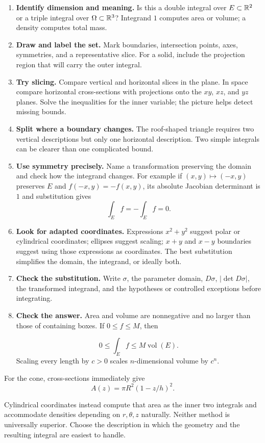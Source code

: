 \begin{enumerate}[label=\arabic*.]
\item \textbf{Identify dimension and meaning.} Is this a double integral
over $E\subset\mathbb{R}^2$ or a triple integral over $\Omega\subset\mathbb{R}^3$?
Integrand $1$ computes area or volume; a density computes total mass.
\item \textbf{Draw and label the set.} Mark boundaries, intersection
points, axes, symmetries, and a representative slice. For a solid, include
the projection region that will carry the outer integral.
\item \textbf{Try slicing.} Compare vertical and horizontal slices in
the plane. In space compare horizontal cross-sections with projections
onto the $xy$, $xz$, and $yz$ planes. Solve the inequalities for the inner
variable; the picture helps detect missing bounds.
\item \textbf{Split where a boundary changes.} The roof-shaped triangle
requires two vertical descriptions but only one horizontal description.
Two simple integrals can be clearer than one complicated bound.
\item \textbf{Use symmetry precisely.} Name a transformation preserving
the domain and check how the integrand changes. For example if
$(x,y)\mapsto(-x,y)$ preserves $E$ and $f(-x,y)=-f(x,y)$, its absolute
Jacobian determinant is $1$ and substitution gives
\[
\int_Ef=-\int_Ef=0.
\]

\item \textbf{Look for adapted coordinates.} Expressions $x^2+y^2$
suggest polar or cylindrical coordinates; ellipses suggest scaling;
$x+y$ and $x-y$ boundaries suggest using those expressions as coordinates.
The best substitution simplifies the domain, the integrand, or ideally both.
\item \textbf{Check the substitution.} Write $\sigma$,
the parameter domain, $D\sigma$, $|\det D\sigma|$, the transformed integrand,
and the hypotheses or controlled exceptions before integrating.
\item \textbf{Check the answer.} Area and volume are nonnegative and no
larger than those of containing boxes. If $0\leq f\leq M$, then

\[
0\leq\int_Ef\leq M\operatorname{vol}(E).
\]
 Scaling every length by
$c>0$ scales $n$-dimensional volume by $c^n$.
\end{enumerate}
For the cone, cross-sections immediately give
\[
A(z)=\pi R^2(1-z/h)^2.
\]

Cylindrical coordinates instead compute that area as the inner two
integrals and accommodate densities depending on $r,\theta,z$ naturally.
Neither method is universally superior. Choose the description in which
the geometry and the resulting integral are easiest to handle.

